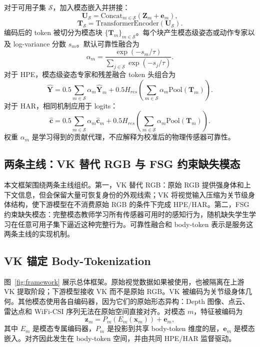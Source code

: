 \documentclass[UTF8,twocolumn]{ctexart}
\begin{document}
对于可用子集 $\mathcal{S}$，加入模态嵌入并拼接：
\begin{equation}
    \mathbf{U}_{\mathcal{S}}=\mathrm{Concat}_{m\in\mathcal{S}}(\mathbf{Z}_{m}+\mathbf{e}_{m}),
\end{equation}
\begin{equation}
    \mathbf{T}_{\mathcal{S}}=\mathrm{TransformerEncoder}(\mathbf{U}_{\mathcal{S}}).
\end{equation}
编码后的 token 被切分为模态块 $\{\mathbf{T}_m\}_{m\in\mathcal{S}}$。每个块产生模态级姿态或动作专家以及 log-variance 分数 $s_m$。默认可靠性融合为
\begin{equation}
    \alpha_m=\frac{\exp(-s_m/\tau)}{\sum_{j\in\mathcal{S}}\exp(-s_j/\tau)}.
\end{equation}
对于 HPE，模态级姿态专家和残差融合 token 头组合为
\begin{equation}
    \hat{\mathbf{Y}}=0.5\sum_{m\in\mathcal{S}}\alpha_m\hat{\mathbf{Y}}_m+
    0.5H_{res}\left(\sum_{m\in\mathcal{S}}\alpha_m\mathrm{Pool}(\mathbf{T}_m)\right).
\end{equation}
对于 HAR，相同机制应用于 logits：
\begin{equation}
    \hat{\mathbf{c}}=0.5\sum_{m\in\mathcal{S}}\alpha_m\hat{\mathbf{c}}_m+
    0.5H_{res}\left(\sum_{m\in\mathcal{S}}\alpha_m\mathrm{Pool}(\mathbf{T}_m)\right).
\end{equation}
权重 $\alpha_m$ 是学习得到的贡献代理，不应解释为校准后的物理传感器可靠性。

\subsection{两条主线：VK 替代 RGB 与 FSG 约束缺失模态}
本文框架围绕两条主线组织。第一，VK 替代 RGB：原始 RGB 提供强身体和上下文信息，但会保留大量可恢复身份的外观线索；VK 将视觉输入压缩为关节级身体结构，使下游模型在不消费原始 RGB 的条件下完成 HPE/HAR。第二，FSG 约束缺失模态：完整模态教师学习所有传感器可用时的感知行为，随机缺失学生学习在任意可用子集下逼近这种完整行为。可靠性融合和 body-token 表示是服务这两条主线的实现机制。

\subsection{VK 锚定 Body-Tokenization}
图~\ref{fig:framework} 展示总体框架。原始视觉数据如果被使用，也被隔离在上游 VK 提取阶段；下游模型接收 VK 而不是原始 RGB。VK 被编码为关节级身体几何。其他模态使用各自编码器，因为它们的原始形态异构：Depth 图像、点云、雷达点和 WiFi-CSI 序列无法在原始空间直接对齐。对模态 $m$，特征被编码为
\begin{equation}
    \mathbf{z}_{m}=P_m(E_m(\mathbf{x}_{m}))+\mathbf{e}_{m},
\end{equation}
其中 $E_m$ 是模态专属编码器，$P_m$ 是投影到共享 body-token 维度的层，$\mathbf{e}_{m}$ 是模态嵌入。对齐因此发生在 body-token 空间，并由共同 HPE/HAR 监督驱动。
\end{document}
